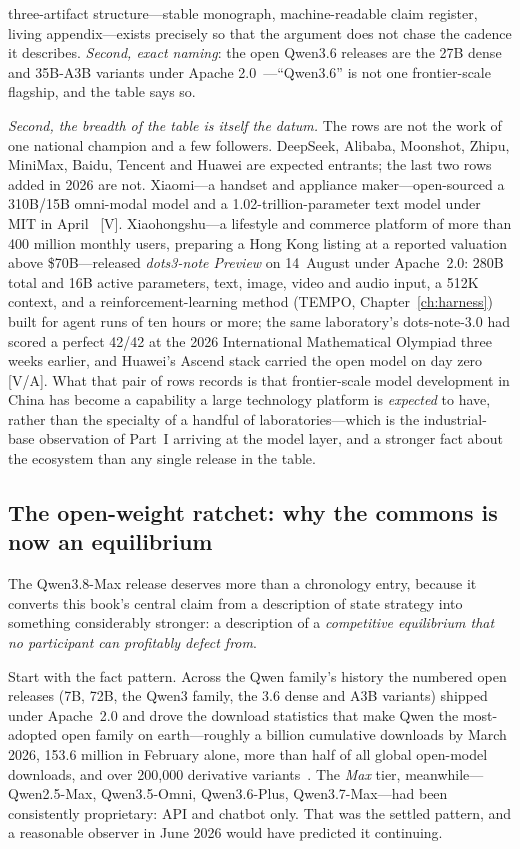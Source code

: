 three-artifact structure---stable monograph, machine-readable claim register, living appendix---exists precisely so that the argument does not chase the cadence it describes. \emph{Second, exact naming}: the open Qwen3.6 releases are the 27B dense and 35B-A3B variants under Apache 2.0~\cite{qwen36-repo}---``Qwen3.6'' is not one frontier-scale flagship, and the table says so.

\emph{Second, the breadth of the table is itself the datum.} The rows are not the work of one national champion and a few followers. DeepSeek, Alibaba, Moonshot, Zhipu, MiniMax, Baidu, Tencent and Huawei are expected entrants; the last two rows added in 2026 are not. Xiaomi---a handset and appliance maker---open-sourced a 310B/15B omni-modal model and a 1.02-trillion-parameter text model under MIT in April~\cite{mimo-v25} [V]. Xiaohongshu---a lifestyle and commerce platform of more than 400 million monthly users, preparing a Hong Kong listing at a reported valuation above \$70B---released \emph{dots3-note Preview} on 14~August under Apache~2.0: 280B total and 16B active parameters, text, image, video and audio input, a 512K context, and a reinforcement-learning method (TEMPO, Chapter~\ref{ch:harness}) built for agent runs of ten hours or more; the same laboratory's dots-note-3.0 had scored a perfect 42/42 at the 2026 International Mathematical Olympiad three weeks earlier, and Huawei's Ascend stack carried the open model on day zero~\cite{dots3-note,dots-imo,dots3-ascend,rednote-ipo} [V/A]. What that pair of rows records is that frontier-scale model development in China has become a capability a large technology platform is \emph{expected} to have, rather than the specialty of a handful of laboratories---which is the industrial-base observation of Part~I arriving at the model layer, and a stronger fact about the ecosystem than any single release in the table.

\subsection{The open-weight ratchet: why the commons is now an equilibrium}
\label{sec:maxtier}

The Qwen3.8-Max release deserves more than a chronology entry, because it converts this book's central claim from a description of state strategy into something considerably stronger: a description of a \emph{competitive equilibrium that no participant can profitably defect from}.

Start with the fact pattern. Across the Qwen family's history the numbered open releases (7B, 72B, the Qwen3 family, the 3.6 dense and A3B variants) shipped under Apache~2.0 and drove the download statistics that make Qwen the most-adopted open family on earth---roughly a billion cumulative downloads by March 2026, 153.6 million in February alone, more than half of all global open-model downloads, and over 200,000 derivative variants~\cite{qwen-downloads}. The \emph{Max} tier, meanwhile---Qwen2.5-Max, Qwen3.5-Omni, Qwen3.6-Plus, Qwen3.7-Max---had been consistently proprietary: API and chatbot only. That was the settled pattern, and a reasonable observer in June 2026 would have predicted it continuing.

